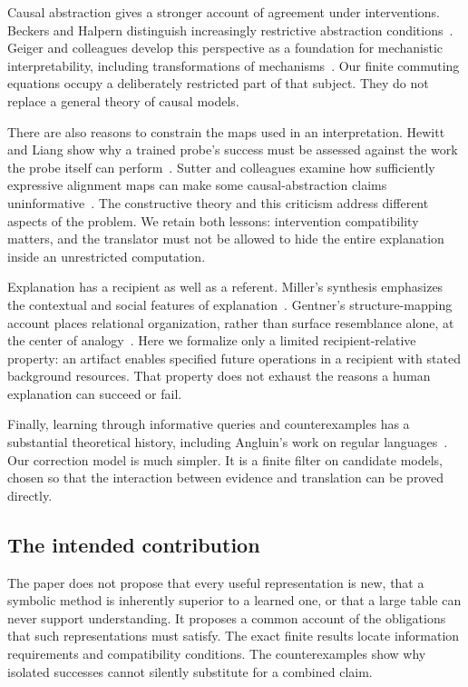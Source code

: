 \documentclass[11pt,letterpaper]{article}
\theoremstyle{plain}
\theoremstyle{definition}
\begin{document}
Causal abstraction gives a stronger account of agreement under interventions. Beckers and Halpern distinguish increasingly restrictive abstraction conditions~\cite{beckers}. Geiger and colleagues develop this perspective as a foundation for mechanistic interpretability, including transformations of mechanisms~\cite{geiger}. Our finite commuting equations occupy a deliberately restricted part of that subject. They do not replace a general theory of causal models.

There are also reasons to constrain the maps used in an interpretation. Hewitt and Liang show why a trained probe's success must be assessed against the work the probe itself can perform~\cite{hewitt}. Sutter and colleagues examine how sufficiently expressive alignment maps can make some causal-abstraction claims uninformative~\cite{sutter}. The constructive theory and this criticism address different aspects of the problem. We retain both lessons: intervention compatibility matters, and the translator must not be allowed to hide the entire explanation inside an unrestricted computation.

Explanation has a recipient as well as a referent. Miller's synthesis emphasizes the contextual and social features of explanation~\cite{miller}. Gentner's structure-mapping account places relational organization, rather than surface resemblance alone, at the center of analogy~\cite{gentner}. Here we formalize only a limited recipient-relative property: an artifact enables specified future operations in a recipient with stated background resources. That property does not exhaust the reasons a human explanation can succeed or fail.

Finally, learning through informative queries and counterexamples has a substantial theoretical history, including Angluin's work on regular languages~\cite{angluin}. Our correction model is much simpler. It is a finite filter on candidate models, chosen so that the interaction between evidence and translation can be proved directly.

\subsection{The intended contribution}
The paper does not propose that every useful representation is new, that a symbolic method is inherently superior to a learned one, or that a large table can never support understanding. It proposes a common account of the obligations that such representations must satisfy. The exact finite results locate information requirements and compatibility conditions. The counterexamples show why isolated successes cannot silently substitute for a combined claim.
\end{document}
